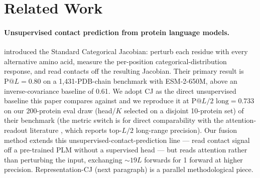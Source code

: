 \documentclass{article}
\begin{document}
\section{Related Work}
\label{sec:related}

\paragraph{Unsupervised contact prediction from protein language models.}
\citet{zhang2024cj} introduced the Standard Categorical Jacobian:
perturb each residue with every alternative amino acid, measure the
per-position categorical-distribution response, and read contacts off
the resulting Jacobian. Their primary result is
$\text{P}@L = 0.80$ on a 1{,}431-PDB-chain benchmark with ESM-2-650M,
above an inverse-covariance baseline of 0.61.
We adopt CJ as the direct unsupervised baseline this paper compares
against and we reproduce it at
$\text{P}@L/2 \text{ long} = 0.733$ on our 200-protein eval draw
(head/$K$ selected on a disjoint 10-protein set) of
their benchmark (the metric switch is for direct comparability with
the attention-readout literature
\citep{rao2021transformerplm,rao2021msa}, which reports
top-$L/2$ long-range precision). Our fusion method extends this
unsupervised-contact-prediction line --- read contact signal off a
pre-trained PLM without a supervised head --- but reads attention
rather than perturbing the input, exchanging $\sim 19L$ forwards
for 1 forward at higher precision. Representation-CJ (next
paragraph) is a parallel methodological piece.
\end{document}
